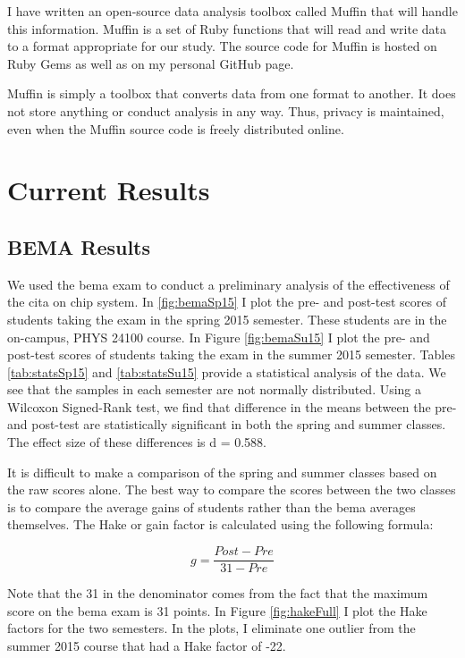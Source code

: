 I have written an open-source data analysis toolbox called Muffin that will handle this information. Muffin is a set of Ruby functions that will read and write data to a format appropriate for our study. The source code for Muffin is hosted on Ruby Gems as well as on my personal GitHub page.

Muffin is simply a toolbox that converts data from one format to another. It does not store anything or conduct analysis in any way. Thus, privacy is maintained, even when the Muffin source code is freely distributed online.

\section{Current Results}

\subsection{BEMA Results}

We used the \gls{bema} exam to conduct a preliminary analysis of the effectiveness of the \gls{cita} on \gls{chip} system. In \ref{fig:bemaSp15} I plot the pre- and post-test scores of students taking the exam in the spring 2015 semester. These students are in the on-campus, PHYS 24100 course. In Figure \ref{fig:bemaSu15} I plot the pre- and post-test scores of students taking the exam in the summer 2015 semester. Tables \ref{tab:statsSp15} and \ref{tab:statsSu15} provide a statistical analysis of the data. We see that the samples in each semester are not normally distributed. Using a Wilcoxon Signed-Rank test, we find that difference in the means between the pre- and post-test are statistically significant in both the spring and summer classes. The effect size of these differences is d = 0.588.

It is difficult to make a comparison of the spring and summer classes based on the raw scores alone. The best way to compare the scores between the two classes is to compare the average gains of students rather than the \gls{bema} averages themselves. The Hake or gain factor is calculated using the following formula:

\begin{equation}
	g = \frac{Post - Pre}{31 - Pre}
\end{equation}

Note that the 31 in the denominator comes from the fact that the maximum score on the \gls{bema} exam is 31 points. In Figure \ref{fig:hakeFull} I plot the Hake factors for the two semesters. In the plots, I eliminate one outlier from the summer 2015 course that had a Hake factor of -22.

